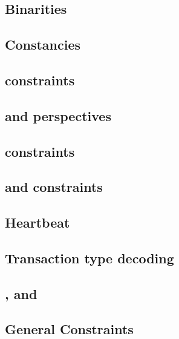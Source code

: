 \subsection{Binarities}                              \label{rlp txn v2: generalities: binarities}                     
\subsection{Constancies}                             \label{rlp txn v2: generalities: constancies}                    
\subsection{\locPhaseFlagSum{} constraints}          \label{rlp txn v2: generalities: phase flag sum}                 
\subsection{\locPerspFlagSum{} and perspectives}     \label{rlp txn v2: generalities: perspectives}                   
\subsection{\phaseEnd{} constraints}                 \label{rlp txn v2: generalities: PHASE_END constraints}          
\subsection{\ct{} and \maxCt{} constraints}          \label{rlp txn v2: generalities: ct and ct_max}                  
\subsection{Heartbeat}                               \label{rlp txn v2: generalities: heartbeat}                      
\subsection{Transaction type decoding}               \label{rlp txn v2: generalities: transaction row constraints}    
\subsection{\lc{}, \lx{} and \lt{}}                  \label{rlp txn v2: generalities: lc lx and lt}                   
\subsection{General Constraints}                     \label{rlp txn v2: generalities: general constraints}            
